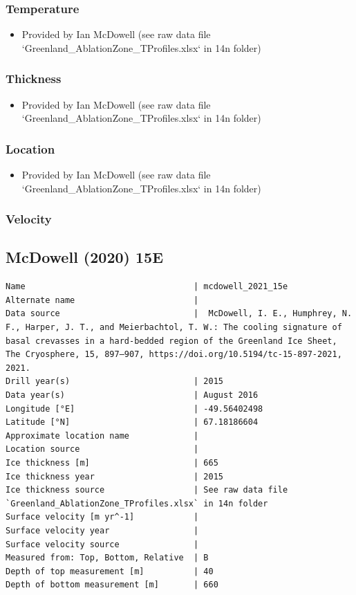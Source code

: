 \documentclass[article,a4paper,times,11pt,twoside]{article}
\begin{document}
\subsubsection{Temperature}
\label{sec:orgfc86ff4}

\begin{itemize}
\item Provided by Ian McDowell (see raw data file `Greenland\_AblationZone\_TProfiles.xlsx` in 14n folder)
\end{itemize}

\subsubsection{Thickness}
\label{sec:orgaedcd8e}

\begin{itemize}
\item Provided by Ian McDowell (see raw data file `Greenland\_AblationZone\_TProfiles.xlsx` in 14n folder)
\end{itemize}

\subsubsection{Location}
\label{sec:org0b0286c}

\begin{itemize}
\item Provided by Ian McDowell (see raw data file `Greenland\_AblationZone\_TProfiles.xlsx` in 14n folder)
\end{itemize}

\subsubsection{Velocity}
\label{sec:org786ab1c}
\clearpage
\subsection{McDowell (2020) 15E}
\label{sec:orgb3621d2}
\begin{verbatim}
Name                                  | mcdowell_2021_15e
Alternate name                        | 
Data source                           |  McDowell, I. E., Humphrey, N. F., Harper, J. T., and Meierbachtol, T. W.: The cooling signature of basal crevasses in a hard-bedded region of the Greenland Ice Sheet, The Cryosphere, 15, 897–907, https://doi.org/10.5194/tc-15-897-2021, 2021.
Drill year(s)                         | 2015
Data year(s)                          | August 2016
Longitude [°E]                        | -49.56402498
Latitude [°N]                         | 67.18186604
Approximate location name             | 
Location source                       | 
Ice thickness [m]                     | 665
Ice thickness year                    | 2015
Ice thickness source                  | See raw data file `Greenland_AblationZone_TProfiles.xlsx` in 14n folder
Surface velocity [m yr^-1]            | 
Surface velocity year                 | 
Surface velocity source               | 
Measured from: Top, Bottom, Relative  | B
Depth of top measurement [m]          | 40
Depth of bottom measurement [m]       | 660
\end{verbatim}
\end{document}
